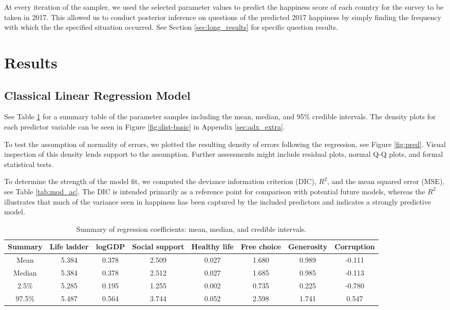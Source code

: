 \documentclass{article}
\begin{document}
At every iteration of the sampler, we used the selected parameter values to predict the happiness score of each country for the survey to be taken in 2017. This allowed us to conduct posterior inference on questions of the predicted 2017 happiness by simply finding the frequency with which the the specified situation occurred. See Section \ref{sec:long_results} for specific question results. 

\section{Results} \label{sec:results}
\subsection{Classical Linear Regression Model}
See Table \ref{tab:summ} for a summary table of the parameter samples including the mean, median, and 95\% credible intervals. The density plots for each predictor variable can be seen in Figure \ref{fig:dist-basic} in Appendix \ref{sec:adx_extra}.

To test the assumption of normality of errors, we plotted the resulting density of errors following the regression, see Figure \ref{fig:pred}. Visual inspection of this density lends support to the assumption. Further assessments might include residual plots, normal Q-Q plots, and formal statistical tests. 

To determine the strength of the model fit, we computed the deviance information criterion (DIC), $R^2$, and the mean squared error (MSE), see Table \ref{tab:mod_ac}. The DIC is intended primarily as a reference point for comparison with potential future models, whereas the $R^2$ illustrates that much of the variance seen in happiness has been captured by the included predictors and indicates a strongly predictive model.

\begin{table}[h!]
\centering
\caption{\label{tab:summ} Summary of regression coefficients: mean, median, and credible intervals.}
\begin{tabular}{c c c c c c c c} \hline
Summary & Life ladder & logGDP & Social support & Healthy life & Free choice & Generosity & Corruption \\\hline
Mean & 5.384 & 0.378  & 2.509  & 0.027 & 1.680 & 0.989& -0.111\\
Median & 5.384 & 0.378 & 2.512 & 0.027 & 1.685 & 0.985 & -0.113\\
2.5\% & 5.285 & 0.195 &  1.255 & 0.002 & 0.735 & 0.225 & -0.780 \\
97.5\% & 5.487 & 0.564 & 3.744 & 0.052 & 2.598 & 1.741 & 0.547 \\\hline
\end{tabular} 
\end{table}
\end{document}
